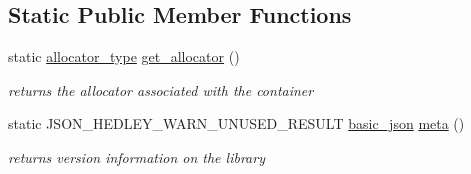 \subsection*{Static Public Member Functions}
\begin{DoxyCompactItemize}
\item 
\mbox{\label{classnlohmann_1_1basic__json_af4ac14224fbdd29d3547fcb11bb55c8f}} 
static \mbox{\hyperlink{classnlohmann_1_1basic__json_a86ce930490cf7773b26f5ef49c04a350}{allocator\+\_\+type}} \mbox{\hyperlink{classnlohmann_1_1basic__json_af4ac14224fbdd29d3547fcb11bb55c8f}{get\+\_\+allocator}} ()
\begin{DoxyCompactList}\small\item\em returns the allocator associated with the container \end{DoxyCompactList}\item 
static J\+S\+O\+N\+\_\+\+H\+E\+D\+L\+E\+Y\+\_\+\+W\+A\+R\+N\+\_\+\+U\+N\+U\+S\+E\+D\+\_\+\+R\+E\+S\+U\+LT \mbox{\hyperlink{classnlohmann_1_1basic__json}{basic\+\_\+json}} \mbox{\hyperlink{classnlohmann_1_1basic__json_a677318a34ade7f8177a2784c06aa3671}{meta}} ()
\begin{DoxyCompactList}\small\item\em returns version information on the library \end{DoxyCompactList}\end{DoxyCompactItemize}
